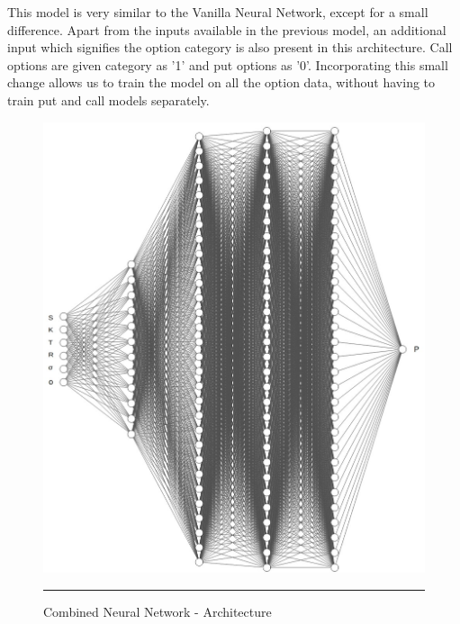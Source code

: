 This model is very similar to the Vanilla Neural Network, except for a small difference. Apart from the inputs available in the previous model, an additional input which signifies the option category is also present in this architecture. Call options are given category as '1' and put options as '0'. Incorporating this small change allows us to train the model on all the option data, without having to train put and call models separately.

\begin{figure}[htbp]
  \centering
    \includegraphics[scale=0.45]{Figures/model_2_combined.jpg}
    \rule{35em}{0.5pt}
  \caption[Combined Neural Network - Architecture]{Combined Neural Network - Architecture}
  \label{fig:model_2_combined}
\end{figure}
